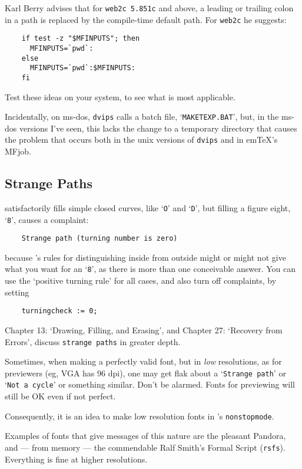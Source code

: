 Karl {\sc Berry} advises that for {\tt web2c 5.851c} and above,
a leading or trailing colon in a path is replaced by the compile-time
default path.  For {\tt web2c} he suggests:
\begin{verbatim}
    if test -z "$MFINPUTS"; then
      MFINPUTS=`pwd`:
    else
      MFINPUTS=`pwd`:$MFINPUTS:
    fi
\end{verbatim}

Test these ideas on your system, to see what is most applicable.

Incidentally, on {\sc ms-dos}, {\tt dvips} calls a batch file,
`{\tt MAKETEXP.BAT}', but, in the {\sc ms-dos} versions I've seen,
this lacks the change to a temporary directory that causes
the problem that occurs both in the {\sc unix} versions of {\tt dvips}
and in em\TeX{}'s MFjob.


\subsection{Strange Paths}

\MF{} satisfactorily fills simple closed curves, like `{\tt O}'
and `{\tt D}', but filling a figure eight, `{\tt 8}', causes a
complaint:
\begin{verbatim}
    Strange path (turning number is zero)
\end{verbatim}
because \MF{}'s rules for distinguishing inside from outside
might or might not give what you want for an `{\tt 8}', as there is
more than one conceivable answer.  You can use the `positive turning
rule' for all cases, and also turn off complaints, by setting
\begin{verbatim}
    turningcheck := 0;
\end{verbatim}
Chapter 13:  `Drawing, Filling, and Erasing', and Chapter 27:
`Recovery from Errors', discuss {\tt strange paths} in greater
depth.


Sometimes, when making a perfectly valid font, but in {\em low\/}
resolutions, as for previewers (eg, VGA has 96 dpi), one may get
flak about a `{\tt Strange path}' or `{\tt Not a cycle}' or
something similar.  Don't be alarmed.  Fonts for previewing will
still be OK even if not perfect.

Consequently, it is an idea to make low resolution fonts in
\MF{}'s \hbox{\tt nonstopmode}.

Examples of fonts that give messages of this nature are the pleasant
Pandora, and --- from memory --- the commendable Ralf Smith's
Formal Script ({\tt rsfs}).  Everything is fine at higher resolutions.

